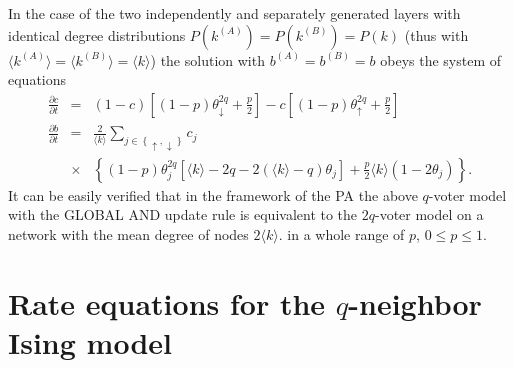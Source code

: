 \documentclass[11pt]{article}
\begin{document}
In the case of the two independently and separately generated layers with identical degree distributions $P\left( k^{(A)}\right) =P\left( k^{(B)}\right) = P(k)$
(thus with $\langle k^{(A)} \rangle = \langle k^{(B)}\rangle = \langle k\rangle$) the solution with $b^{(A)}=b^{(B)} =b$  obeys the system of equations
\begin{eqnarray}
\frac{\partial c}{\partial t} &=&(1-c) \left[ (1-p)\theta_{\downarrow}^{2q} +\frac{p}{2}\right] -
c\left[ (1-p)\theta_{\uparrow}^{2q} +\frac{p}{2}\right] \\
\frac{\partial b}{\partial t} &=& \frac{2}{\langle k\rangle} \sum_{j\in \left\{ \uparrow,\downarrow\right\}} c_{j} \nonumber\\
& \times&  
 \left\{ (1-p) \theta_{j}^{2q}
\left[  \langle k\rangle-2q -2 \left( \langle k\rangle -q\right) \theta_{j} \right]
+\frac{p}{2}\langle k\rangle \left(1-2 \theta_{j}\right) \right\}.
\end{eqnarray}
It can be easily verified that in the framework of the PA the above $q$-voter model with the GLOBAL AND update rule is equivalent to 
the $2q$-voter model on a network with the mean degree of nodes $2 \langle k\rangle$.
in a whole range of $p$, $0\le p\le1$.

\section{Rate equations for the $q$-neighbor Ising model}
\end{document}
